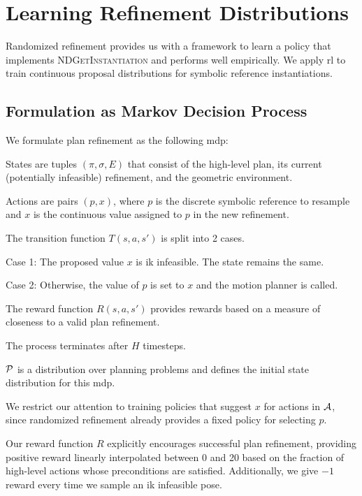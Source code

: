 \section{Learning Refinement Distributions}
Randomized refinement provides us with a framework to learn a policy that implements
\textsc{NDGetInstantiation} and performs well empirically. We apply {\sc rl}
to train continuous proposal distributions for symbolic reference instantiations.

\subsection{Formulation as Markov Decision Process}
We formulate plan refinement as the following {\sc mdp}:
\begin{tightlist}
\item States are tuples $(\pi, \sigma, E)$ that consist of the
high-level plan, its current (potentially infeasible) refinement, and the
geometric environment.
\item Actions are pairs $(p, x)$, where $p$ is the discrete symbolic
reference to resample and $x$ is the continuous value assigned to $p$ in the new refinement.
\item The transition function $T(s, a, s')$ is split into 2 cases.
  \begin{tightlist}
  \item Case 1: The proposed value $x$ is {\sc ik} infeasible. The state remains the same.
  \item Case 2: Otherwise, the value of $p$ is set to $x$ and the motion planner is called.
  \end{tightlist}
\item The reward function $R(s, a, s')$ provides rewards based on a measure of closeness to a valid plan refinement.
\item The process terminates after $H$ timesteps.
\item $\mathcal{P}$ is a distribution over planning problems and defines the initial state distribution for this {\sc mdp}.
\end{tightlist}

We restrict our attention to training policies that suggest $x$ for actions in $\mathcal{A}$, since
randomized refinement already provides a fixed policy for selecting $p$.

Our reward function $R$ explicitly encourages successful plan refinement, providing positive reward linearly
interpolated between 0 and 20 based on the fraction of high-level actions whose preconditions are
satisfied. Additionally, we give $-1$ reward every time we sample an {\sc ik} infeasible pose.

